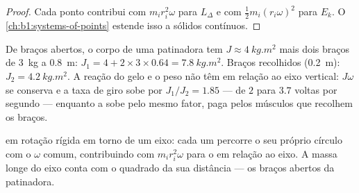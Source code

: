 \begin{proof}
Cada ponto contribui com $m_ir_i^2\omega$ para $L_\Delta$ e com
$\tfrac12 m_i(r_i\omega)^2$ para $E_k$. O \cref{ch:b1:systems-of-points}
estende isso a sólidos contínuos.
\end{proof}

\begin{example}[A patinadora]\label{ex:b1:angular-momentum:skater}
De braços abertos, o corpo de uma patinadora tem $J \approx \qty{4}{kg.m^2}$ mais dois
braços de \qty{3}{kg} a \qty{0.8}{m}: $J_1 = 4 + 2 \times 3 \times 0.64 =
\qty{7.8}{kg.m^2}$. Braços recolhidos (\qty{0.2}{m}): $J_2 = \qty{4.2}{kg.m^2}$.
A reação do gelo e o peso não têm  em relação ao eixo
vertical: $J\omega$ se conserva e a taxa de giro sobe por $J_1/J_2 = 1.85$
--- de $2$ para $3.7$ voltas por segundo --- enquanto a  sobe
pelo mesmo fator, paga pelos músculos que recolhem os braços.
\end{example}

\begin{omfigure}

{\small {} em rotação rígida em torno de um eixo: cada um percorre o seu próprio
círculo com o $\omega$ comum, contribuindo com $m_ir_i^2\omega$ para o
 em relação ao eixo. A massa longe do eixo conta com o
quadrado da sua distância --- os braços abertos da patinadora.}
\end{omfigure}

